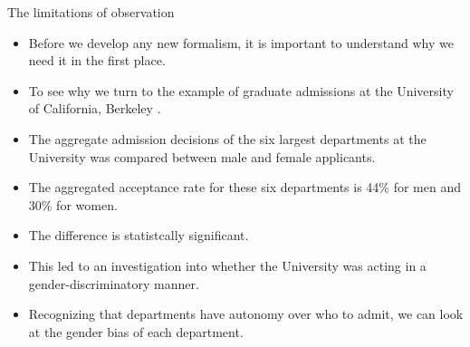 \documentclass[handout]{beamer}
\begin{document}
\begin{frame}{The limitations of observation}
\scriptsize{
\begin{itemize}
\item Before we develop any new formalism, it is important to understand why we need it in the first place.
\item To see why we turn to the  example of graduate admissions at the University of California, Berkeley  \cite{bickel1975sex}.

\item The aggregate admission decisions of the six largest departments at the University was compared between male and female applicants. 
\item The aggregated acceptance rate for these six departments is 44\% for men and 30\% for women.

\item The difference is statistcally significant. 
\item  This led to an investigation into whether the University was acting in a gender-discriminatory manner.

\item Recognizing that departments have autonomy over who to admit, we can look at the gender bias of each department.


\end{itemize}

} 

\end{frame}
\end{document}
